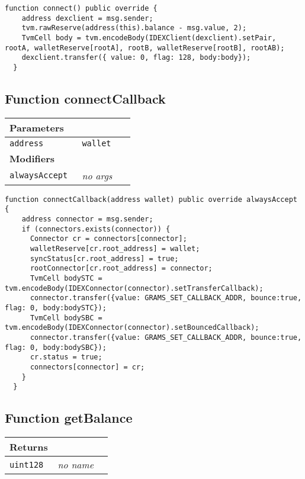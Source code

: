 \begin{lstlisting}[firstnumber=149]
  function connect() public override {
    address dexclient = msg.sender;
    tvm.rawReserve(address(this).balance - msg.value, 2);
    TvmCell body = tvm.encodeBody(IDEXClient(dexclient).setPair, rootA, walletReserve[rootA], rootB, walletReserve[rootB], rootAB);
    dexclient.transfer({ value: 0, flag: 128, body:body});
  }
\end{lstlisting}

\subsection{Function connectCallback}


\ifsoltables
\noindent\begin{tabular}{|l|l|p{5cm}|}\hline
\multicolumn{3}{|l|}{\bf Parameters}\\\hline
\tt address & \tt wallet &\\\hline
\multicolumn{3}{|l|}{\bf Modifiers}\\\hline
\tt alwaysAccept & {\em no args} &\\\hline
\end{tabular}
\fi

\vspace{2cm}

\begin{lstlisting}[firstnumber=132]
  function connectCallback(address wallet) public override alwaysAccept {
    address connector = msg.sender;
    if (connectors.exists(connector)) {
      Connector cr = connectors[connector];
      walletReserve[cr.root_address] = wallet;
      syncStatus[cr.root_address] = true;
      rootConnector[cr.root_address] = connector;
      TvmCell bodySTC = tvm.encodeBody(IDEXConnector(connector).setTransferCallback);
      connector.transfer({value: GRAMS_SET_CALLBACK_ADDR, bounce:true, flag: 0, body:bodySTC});
      TvmCell bodySBC = tvm.encodeBody(IDEXConnector(connector).setBouncedCallback);
      connector.transfer({value: GRAMS_SET_CALLBACK_ADDR, bounce:true, flag: 0, body:bodySBC});
      cr.status = true;
      connectors[connector] = cr;
    }
  }
\end{lstlisting}

\subsection{Function getBalance}


\ifsoltables
\noindent\begin{tabular}{|l|l|p{5cm}|}\hline
\multicolumn{3}{|l|}{\bf Returns}\\\hline
\tt uint128 & {\em no name} &\\\hline
\end{tabular}
\fi

